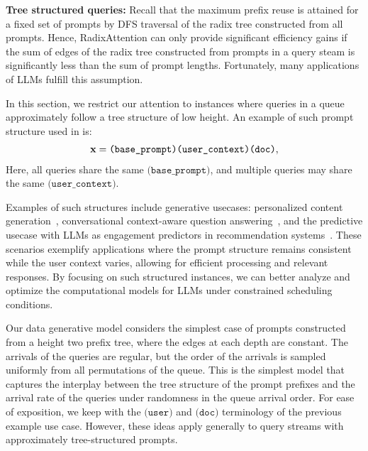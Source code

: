 \textbf{Tree structured queries:} Recall that the maximum prefix reuse is attained for a fixed set of prompts by DFS traversal of the radix tree constructed from all prompts. Hence, RadixAttention can only provide significant efficiency gains if the sum of edges of the radix tree constructed from prompts in a query steam is significantly less than the sum of prompt lengths. Fortunately, many applications of LLMs fulfill this assumption.


In this section, we restrict our attention to instances where queries in a queue approximately follow a tree structure of low height. An example of such prompt structure used in \cite{360brew} is:
\begin{gather*}
    \mathbf{x} = \texttt{(base\_prompt)(user\_context)(doc)},
\end{gather*}
Here, all queries share the same $\texttt{(base\_prompt)}$, and multiple queries may share the same $\texttt{(user\_context)}$.

Examples of such structures include generative usecases: personalized content generation~\cite{zhang2024personalization}, conversational context-aware question answering~\cite{zaib2022conversational}, and the predictive usecase with LLMs as engagement predictors in recommendation systems~\cite{wu2024survey}.
These scenarios exemplify applications where the prompt structure remains consistent while the user context varies, allowing for efficient processing and relevant responses. By focusing on such structured instances, we can better analyze and optimize the computational models for LLMs under constrained scheduling conditions.

Our data generative model considers the simplest case of prompts constructed from a height two prefix tree, where the edges at each depth are constant. The arrivals of the queries are regular, but the order of the arrivals is sampled uniformly from all permutations of the queue. This is the simplest model that captures the interplay between the tree structure of the prompt prefixes and the arrival rate of the queries under randomness in the queue arrival order. For ease of exposition, we keep with the $\texttt{(user)}$ and $\texttt{(doc)}$ terminology of the previous example use case. However, these ideas apply generally to query streams with approximately tree-structured prompts.

